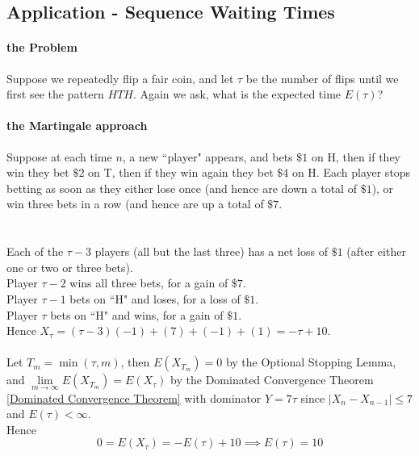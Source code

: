 \documentclass[11pt]{article}
\renewcommand{\limit}[1]{\underset{{#1} \rightarrow \infty}{\lim}}
\begin{document}
    \subsection{Application - Sequence Waiting Times}
    \paragraph{the Problem}
    Suppose we repeatedly flip a fair coin, and let $\tau$ be the number of flips until we first see the pattern $HTH$. Again we ask, what is the expected time $E(\tau)$?
    \paragraph{the Martingale approach}
    Suppose at each time $n$, a new ``player" appears, and bets $\$ 1$ on H, then if they win they bet $\$2$ on T, then if they win again they bet $\$4$ on H. Each player stops betting as soon as they either lose once (and hence are down a total of $\$1$), or win three bets in a row (and hence are up a total of $\$7$.\\
     \\\\
    Each of the $\tau - 3$ players (all but the last three) has a net loss of $\$ 1$ (after either one or two or three bets).\\
    Player $\tau - 2$ wins all three bets, for a gain of $\$ 7$.\\
    Player $\tau - 1$ bets on ``H" and loses, for a loss of $\$ 1$.\\
    Player $\tau$ bets on ``H" and wins, for a gain of $\$ 1$.\\
    Hence $X_{\tau} = (\tau -3)(-1) + (7) + (-1) + (1) = -\tau + 10$.\\\\
    Let $T_m = \min(\tau, m)$, then $E(X_{T_m}) = 0$ by the Optional Stopping Lemma, and $\limit{m} E(X_{T_m}) = E(X_{\tau})$ by the Dominated Convergence Theorem \ref{Dominated Convergence Theorem} with dominator $Y = 7\tau$ since $|X_n - X_{n-1}| \leq 7$ and $E(\tau) < \infty$.\\
    Hence $$0 = E(X_{\tau}) = -E(\tau) + 10 \implies E(\tau) = 10$$
     
    
\end{document}
